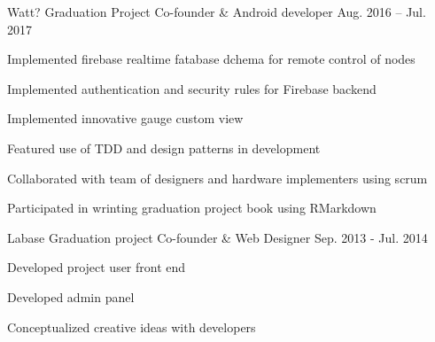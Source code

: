 \begin{cvprojects}
\cvproject
    {Watt? Graduation Project} %
    {Co-founder \& Android developer} %
    {Aug. 2016 – Jul. 2017} %
    {
      \begin{cvitems} %
        \item {Implemented firebase realtime fatabase dchema for remote control of nodes}
        \item {Implemented authentication and security rules for Firebase backend}
        \item {Implemented innovative gauge custom view}
        \item {Featured use of TDD and design patterns in development}
        \item {Collaborated with team of designers and hardware implementers using scrum}
        \item {Participated in wrinting graduation project book using RMarkdown}        
      \end{cvitems}
    }

\cvproject
{Labase Graduation project} %
{Co-founder \& Web Designer} %
{Sep. 2013 - Jul. 2014} %
{
  \begin{cvitems} %
    \item {Developed project user front end}
    \item {Developed admin panel}
    \item {Conceptualized creative ideas with developers}
  \end{cvitems}
}

\end{cvprojects}
